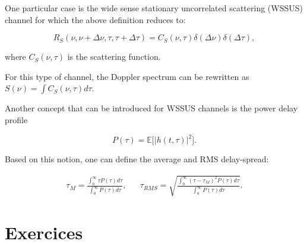 \documentclass [a4paper, 11pt] {article}
\begin{document}
\begin{reminder}
\begin{itemize}
    One particular case is the wide sense stationary uncorrelated scattering (WSSUS) channel for which the above definition reduces to:

        \begin{equation}
        R_S(\nu,\nu+\Delta \nu, \tau, \tau + \Delta \tau) = C_S(\nu, \tau) \delta(\Delta \nu) \delta(\Delta \tau),
        \end{equation}


    where $C_S(\nu, \tau)$ is the scattering function.


    For this type of channel, the Doppler spectrum can be rewritten as $S(\nu) = \int C_S(\nu, \tau) d\tau$.


    Another concept that can be introduced for WSSUS channels is the power delay profile

    \begin{equation}
    P(\tau) = \mathbb{E}\Big[|h(t,\tau)|^2\Big].
    \end{equation}

    Based on this notion, one can define the average and RMS delay-spread:

    \begin{align}
    \tau_M = \frac{\int_0^\infty \tau P(\tau) d\tau}{\int_0^\infty P(\tau) d\tau}, && \tau_{RMS} = \sqrt{\frac{\int_0^\infty (\tau - \tau_M)^2 P(\tau) d\tau}{\int_0^\infty P(\tau) d\tau}}.
    \end{align}

    \end{itemize}
    \end{reminder}
    \pagebreak

    \part*{Exercices}
\end{document}

